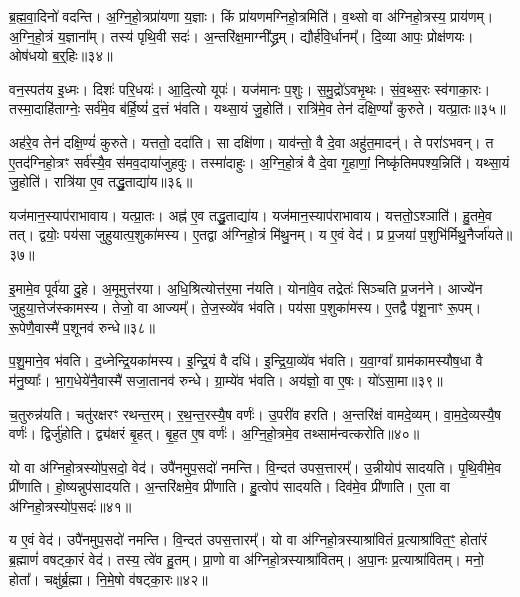 ब्र॒ह्म॒वा॒दिनो॑ वदन्ति।
अ॒ग्नि॒हो॒त्रप्रा॑यणा य॒ज्ञाः।
किं प्रा॑यणमग्निहो॒त्रमिति॑।
व॒थ्सो वा अ॑ग्निहो॒त्रस्य॒ प्राय॑णम्।
अ॒ग्नि॒हो॒त्रं य॒ज्ञाना᳚म्।
तस्य॑ पृथि॒वी सदः॑।
अ॒न्तरि॑क्ष॒माग्नी᳚द्ध्रम्।
द्यौर्\mbox{}ह॑वि॒र्धानम्᳚।
दि॒व्या आपः॒ प्रोक्ष॑णयः।
ओष॑धयो ब॒र्॒हिः॥३४॥

वन॒स्पत॑य इ॒ध्मः।
दिशः॑ परि॒धयः॑।
आ॒दि॒त्यो यूपः॑।
यज॑मानः प॒शुः।
स॒मु॒द्रो॑\-ऽवभृ॒थः।
सं॒व॒थ्स॒रः स्व॑गाका॒रः।
तस्मा॒दाहि॑ताग्नेः॒ सर्व॑मे॒व ब॑र्हि॒ष्यं॑ द॒त्तं भ॑वति।
यथ्सा॒यं जु॒होति॑।
रात्रि॑मे॒व तेन॑ दक्षि॒ण्यां᳚ कुरुते।
यत्प्रा॒तः॥३५॥

अह॑रे॒व तेन॑ दक्षि॒ण्यं॑ कुरुते।
यत्ततो॒ ददा॑ति।
सा दक्षि॑णा।
याव॑न्तो॒ वै दे॒वा अहु॑त॒मादन्॑।
ते परा॑\-ऽभवन्।
त ए॒तद॑ग्निहो॒त्रꣳ सर्व॑स्यै॒व स॑मव॒दाया॑जुहवुः।
तस्मा॑दाहुः।
अ॒ग्नि॒हो॒त्रं वै दे॒वा गृ॒हाणां॒ निष्कृ॑तिमपश्य॒न्निति॑।
यथ्सा॒यं जु॒होति॑।
रात्रि॑या ए॒व तद्धु॒ताद्या॑य॥३६॥

यज॑मान॒स्याप॑रा\-भावाय।
यत्प्रा॒तः।
अह्न॑ ए॒व तद्धु॒ताद्या॑य।
यज॑मान॒स्याप॑राभावाय।
यत्ततो॒\-ऽश्ञाति॑।
हु॒तमे॒व तत्।
द्वयोः॒ पय॑सा जुहुयात्प॒शुका॑मस्य।
ए॒तद्वा अ॑ग्निहो॒त्रं मि॑थु॒नम्।
य ए॒वं वेद॑।
प्र प्र॒जया॑ प॒शुभि॑र्मिथु॒नैर्जा॑यते॥३७॥

इ॒मामे॒व पूर्व॑या दु॒हे।
अ॒मूमुत्त॑रया।
अ॒धि॒श्रित्योत्त॑र॒मा न॑यति।
योना॑वे॒व तद्रेतः॑ सिञ्चति प्र॒जन॑ने।
आज्ये॑न जुहुया॒त्तेज॑स्कामस्य।
तेजो॒ वा आज्यम्᳚।
ते॒ज॒स्व्ये॑व भ॑वति।
पय॑सा प॒शुका॑मस्य।
ए॒तद्वै प॑शू॒नाꣳ रू॒पम्।
रू॒पेणै॒वास्मै॑ प॒शूनव॑ रुन्धे॥३८॥

प॒शु॒माने॒व भ॑वति।
द॒ध्नेन्द्रि॒यका॑मस्य।
इ॒न्द्रि॒यं वै दधि॑।
इ॒न्द्रि॒या॒व्ये॑व भ॑वति।
य॒वा॒ग्वा᳚ ग्राम॑कामस्यौष॒धा वै म॑नु॒ष्याः᳚।
भा॒ग॒धेये॑नै॒वास्मै॑ सजा॒तानव॑ रुन्धे।
ग्रा॒म्ये॑व भ॑वति।
अय॑ज्ञो॒ वा ए॒षः।
यो॑ऽसा॒मा॥३९॥

च॒तुरुन्न॑यति।
चतु॑रक्षरꣳ रथन्त॒रम्।
र॒थ॒न्त॒रस्यै॒ष वर्णः॑।
उ॒परी॑व हरति।
अ॒न्तरि॑क्षं वामदे॒व्यम्।
वा॒म॒दे॒व्यस्यै॒ष वर्णः॑।
द्विर्जु॑होति।
द्व्य॑क्षरं बृ॒हत्।
बृ॒ह॒त ए॒ष वर्णः॑।
अ॒ग्नि॒हो॒त्रमे॒व तथ्साम॑न्वत्करोति॥४०॥

यो वा अ॑ग्निहो॒त्रस्यो॑प॒सदो॒ वेद॑।
उपै॑नमुप॒सदो॑ नमन्ति।
वि॒न्दत॑ उपस॒त्तारम्᳚।
उ॒न्नीयोप॑ सादयति।
पृ॒थि॒वीमे॒व प्री॑णाति।
हो॒ष्यन्नुप॑सादयति।
अ॒न्तरि॑क्षमे॒व प्री॑णाति।
हु॒त्वोप॑ सादयति।
दिव॑मे॒व प्री॑णाति।
ए॒ता वा अ॑ग्निहो॒त्रस्यो॑प॒सदः॑॥४१॥

य ए॒वं वेद॑।
उपै॑नमुप॒सदो॑ नमन्ति।
वि॒न्दत॑ उपस॒त्तारम्᳚।
यो वा अ॑ग्निहो॒त्रस्याश्रा॑वितं प्र॒त्याश्रा॑वित॒ꣳ॒ होता॑रं ब्र॒ह्माणं॑ वषट्का॒रं वेद॑।
तस्य॒ त्वे॑व हु॒तम्।
प्रा॒णो वा अ॑ग्निहो॒त्रस्याश्रा॑वितम्।
अ॒पा॒नः प्र॒त्याश्रा॑वितम्।
मनो॒ होता᳚।
चक्षु॑र्ब्र॒ह्मा।
नि॒मे॒षो व॑षट्का॒रः॥४२॥

